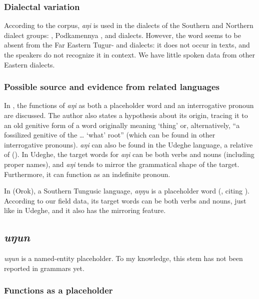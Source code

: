 \documentclass[output=paper,colorlinks,citecolor=brown]{langscibook}
\begin{document}
\subsubsection{Dialectal variation}

According to the corpus, \textit{aŋi} is used in the dialects of the Southern and Northern dialect groups: , Podkamennya , and  dialects. However, the word seems to be absent from the Far Eastern Tugur- and  dialects: it does not occur in texts, and the speakers do not recognize it in context. We have little spoken data from other Eastern dialects.


\subsubsection{Possible source and evidence from related languages}

In \citet[299--302]{Idiatov2007}, the functions of \textit{aŋi} as both a placeholder word and an interrogative pronoun are discussed. The author also states a hypothesis about its origin, tracing it to an old genitive form of a word originally meaning ‘thing’ or, alternatively, “a fossilized genitive of the … ‘what’ root” (which can be found in other interrogative pronouns).
\textit{aŋi} can also be found in the Udeghe language, a relative of  (\citealt[361, 362]{NikolaevaTolskaya2001}). In Udeghe, the target words for \textit{aŋi} can be both verbs and nouns (including proper names), and \textit{aŋi} tends to mirror the grammatical shape of the target. Furthermore, it can function as an indefinite pronoun.

In  (Orok), a Southern Tungusic language, \textit{aŋŋu} is a placeholder word (\citealt[301]{Idiatov2007}, citing \citealt[I: 45]{Cincius1975K}). According to our  field data, its target words can be both verbs and nouns, just like in Udeghe, and it also has the mirroring feature.


\subsection{\textit{uŋun}}

\textit{uŋun} is a named-entity placeholder. To my knowledge, this stem has not been reported in  grammars yet.

\subsubsection{Functions as a placeholder}
\end{document}
